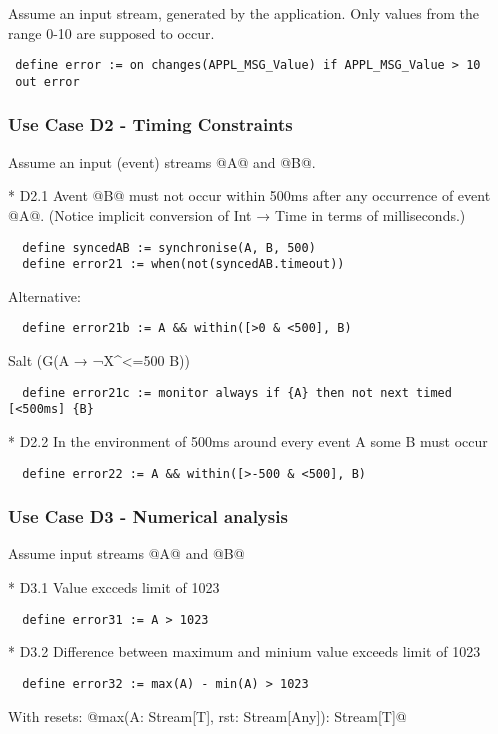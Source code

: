 Assume an input stream, generated by the application. 
Only values from the range 0-10 are supposed to occur.

\begin{lstlisting}
 define error := on changes(APPL_MSG_Value) if APPL_MSG_Value > 10
 out error
\end{lstlisting}

\subsubsection{Use Case D2 - Timing Constraints}

Assume an input (event) streams @A@ and @B@.

* D2.1 Avent @B@ must not occur within 500ms after any occurrence of event @A@. (Notice implicit conversion of Int → Time in terms of milliseconds.)
  
\begin{lstlisting}
  define syncedAB := synchronise(A, B, 500)
  define error21 := when(not(syncedAB.timeout))
\end{lstlisting}

Alternative:
\begin{lstlisting}
  define error21b := A && within([>0 & <500], B)
\end{lstlisting}

Salt (G(A → ¬X^{<=500} B))
\begin{lstlisting}
  define error21c := monitor always if {A} then not next timed [<500ms] {B}
\end{lstlisting}

* D2.2 In the environment of 500ms around every event A some B must occur
\begin{lstlisting}
  define error22 := A && within([>-500 & <500], B)
\end{lstlisting}

\subsubsection{Use Case D3 - Numerical analysis}

Assume input streams @A@ and @B@

* D3.1 Value excceds limit of 1023
\begin{lstlisting}
  define error31 := A > 1023
\end{lstlisting}

* D3.2 Difference between maximum and minium value exceeds limit of 1023
\begin{lstlisting}
  define error32 := max(A) - min(A) > 1023
\end{lstlisting}
With resets: @max(A: Stream[T], rst: Stream[Any]): Stream[T]@


